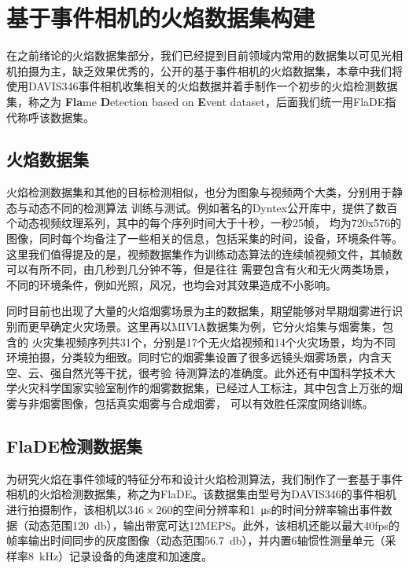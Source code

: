 
\chapter{基于事件相机的火焰数据集构建}
在之前绪论的火焰数据集部分，我们已经提到目前领域内常用的数据集以可见光相机拍摄为主，缺乏效果优秀的，公开的基于事件相机的火焰数据集，本章中我们将使用DAVIS346事件相机收集相关的火焰数据并着手制作一个初步的火焰检测数据集，称之为 \textbf{Fla}me \textbf{D}etection based on \textbf{E}vent dataset，后面我们统一用FlaDE指代称呼该数据集。

\section{火焰数据集}
火焰检测数据集和其他的目标检测相似，也分为图象与视频两个大类，分别用于静态与动态不同的检测算法
训练与测试。例如著名的Dyntex公开库\cite{peteri2008comprehensive}中，提供了数百个动态视频纹理系列，其中的每个序列时间大于十秒，一秒25帧，
均为720x576的图像，同时每个均备注了一些相关的信息，包括采集的时间，设备，环境条件等。这里我们值得提及的是，视频数据集作为训练动态算法的连续帧视频文件，其帧数可以有所不同，由几秒到几分钟不等，但是往往
需要包含有火和无火两类场景，不同的环境条件，例如光照，风况，也均会对其效果造成不小影响。

同时目前也出现了大量的火焰烟雾场景为主的数据集，期望能够对早期烟雾进行识别而更早确定火灾场景。这里再以MIVIA数据集\cite{foggia2015real}为例，它分火焰集与烟雾集，包含的
火灾集视频序列共31个，分别是17个无火焰视频和14个火灾场景，均为不同环境拍摄，分类较为细致。同时它的烟雾集设置了很多远镜头烟雾场景，内含天空、云、强自然光等干扰，很考验
待测算法的准确度。此外还有中国科学技术大学火灾科学国家实验室制作的烟雾数据集，已经过人工标注，其中包含上万张的烟雾与非烟雾图像，包括真实烟雾与合成烟雾，
可以有效胜任深度网络训练。

\section{FlaDE检测数据集}
为研究火焰在事件领域的特征分布和设计火焰检测算法，我们制作了一套基于事件相机的火焰检测数据集，称之为FlaDE。该数据集由型号为DAVIS346的事件相机进行拍摄制作，该相机以$346\times260$的空间分辨率和\SI{1}{\micro\second}的时间分辨率输出事件数据（动态范围\SI{120}{\decibel}），输出带宽可达12MEPS。此外，该相机还能以最大40fps的帧率输出时间同步的灰度图像（动态范围\SI{56.7}{\decibel}），并内置6轴惯性测量单元（采样率\SI{8}{\kilo\hertz}）记录设备的角速度和加速度。

